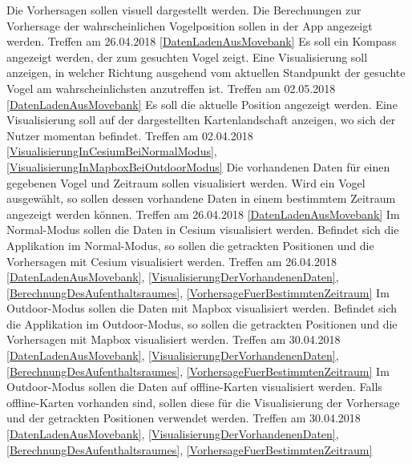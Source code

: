 \documentclass[12pt]{article} %
\begin{document}
\begin{requirements}[ref={(R\arabic*)},label=(R\arabic*),resume]
{
 Die Vorhersagen sollen visuell dargestellt werden. 
 }{
 Die Berechnungen zur Vorhersage der wahrscheinlichen Vogelposition sollen in der App angezeigt werden. 
 }{
 Treffen am 26.04.2018 
 }{
 \ref{DatenLadenAusMovebank} 
}
{
 Es soll ein Kompass angezeigt werden, der zum gesuchten Vogel zeigt. 
 }{
 Eine Visualisierung soll anzeigen, in welcher Richtung ausgehend vom aktuellen Standpunkt der gesuchte Vogel am wahrscheinlichsten anzutreffen ist. 
 }{
 Treffen am 02.05.2018 
 }{
 \ref{DatenLadenAusMovebank} 
}
{
 Es soll die aktuelle Position angezeigt werden. 
 }{
 Eine Visualisierung soll auf der dargestellten Kartenlandschaft anzeigen, wo sich der Nutzer momentan befindet.
 }{
 Treffen am 02.04.2018 
 }{
 \ref{VisualisierungInCesiumBeiNormalModus}, \ref{VisualisierungInMapboxBeiOutdoorModus} 
}
{
 Die vorhandenen Daten für einen gegebenen Vogel und Zeitraum sollen visualisiert werden. 
 }{
 Wird ein Vogel ausgewählt, so sollen dessen vorhandene Daten in einem bestimmtem Zeitraum angezeigt werden können.
 }{
 Treffen am 26.04.2018 
 }{
 \ref{DatenLadenAusMovebank} 
}
{
 Im Normal-Modus sollen die Daten in Cesium visualisiert werden.
 }{
 Befindet sich die Applikation im Normal-Modus, so sollen die getrackten Positionen und die Vorhersagen mit Cesium visualisiert werden.
 }{
 Treffen am 26.04.2018
 }{
 \ref{DatenLadenAusMovebank}, \ref{VisualisierungDerVorhandenenDaten}, \ref{BerechnungDesAufenthaltsraumes}, \ref{VorhersageFuerBestimmtenZeitraum}
}
{
 Im Outdoor-Modus sollen die Daten mit Mapbox visualisiert werden.
 }{
 Befindet sich die Applikation im Outdoor-Modus, so sollen die getrackten Positionen und die Vorhersagen mit Mapbox visualisiert werden.
 }{
 Treffen am 30.04.2018
 }{
 \ref{DatenLadenAusMovebank}, \ref{VisualisierungDerVorhandenenDaten}, \ref{BerechnungDesAufenthaltsraumes}, \ref{VorhersageFuerBestimmtenZeitraum}
}
{
 Im Outdoor-Modus sollen die Daten auf offline-Karten visualisiert werden.
 }{
 Falls offline-Karten vorhanden sind, sollen diese für die Visualisierung der Vorhersage und der getrackten Positionen verwendet werden. 
 }{
 Treffen am 30.04.2018
 }{
 \ref{DatenLadenAusMovebank}, \ref{VisualisierungDerVorhandenenDaten}, \ref{BerechnungDesAufenthaltsraumes}, \ref{VorhersageFuerBestimmtenZeitraum}
}
\end{requirements}
\end{document}
